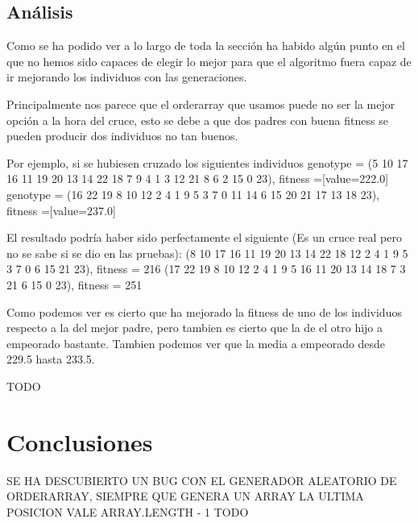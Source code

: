 \documentclass[a4paper,12pt,titlepage]{article}
\begin{document}
\subsection{Análisis}
Como se ha podido ver a lo largo de toda la sección ha habido algún punto en el que no hemos sido capaces de elegir lo mejor para que el algoritmo fuera capaz de ir mejorando los individuos con las generaciones. 


Principalmente nos parece que el orderarray que usamos puede no ser la mejor opción a la hora del cruce, esto se debe a que dos padres con buena fitness se pueden producir dos individuos no tan buenos.

Por ejemplo, si se hubiesen cruzado los siguientes individuos
genotype = (5 10 17 16 11 19 20 13 14 22 18 7 9 4 1 3 12 21 8 6 2 15 0 23), fitness =[value=222.0]
genotype = (16 22 19 8 10 12 2 4 1 9 5 3 7 0 11 14 6 15 20 21 17 13 18 23), fitness =[value=237.0]

El resultado podría haber sido perfectamente el siguiente (Es un cruce real pero no se sabe si se dio en las pruebas):
(8 10 17 16 11 19 20 13 14 22 18 12 2 4 1 9 5 3 7 0 6 15 21 23), fitness = 216
(17 22 19 8 10 12 2 4 1 9 5 16 11 20 13 14 18 7 3 21 6 15 0 23), fitness = 251

Como podemos ver es cierto que ha mejorado la fitness de uno de los individuos respecto a la del mejor padre, pero tambien es cierto que la de el otro hijo a empeorado bastante. Tambien podemos ver que la media a empeorado desde 229.5 hasta 233.5.

 

TODO

\section{Conclusiones}
SE HA DESCUBIERTO UN BUG CON EL GENERADOR ALEATORIO DE ORDERARRAY, SIEMPRE QUE GENERA UN ARRAY LA ULTIMA POSICION VALE ARRAY.LENGTH - 1  
TODO

\newpage


\end{document}
